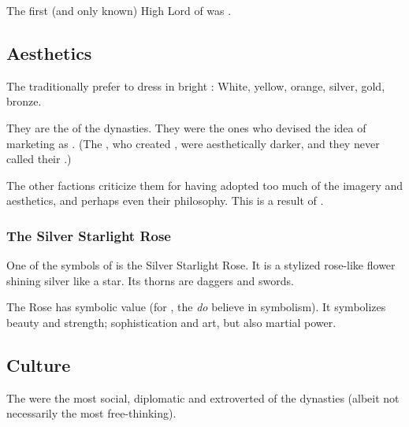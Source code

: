 The first (and only known) High Lord of \KiriathSepher{} was . 









\subsection{Aesthetics}
The \CiriathSepher{} traditionally prefer to dress in bright \colours: 
White, yellow, orange, silver, gold, bronze. 

They are the  of the dynasties. 
They were the ones who devised the idea of marketing \Iquin{} as . 
(The \Kezeradi{}, who created \Iquin, were aesthetically darker, and they never called their \dweomer{} .) 

The other factions criticize them for having adopted too much of the \Merkyran{} imagery and aesthetics, and perhaps even their philosophy. This is a result of .





\subsubsection{The Silver Starlight Rose}
One of the symbols of \CiriathSepher{} is the Silver Starlight Rose. 
It is a stylized rose-like flower shining silver like a star. 
Its thorns are daggers and swords. 

The Rose has symbolic value (for , the \CiriathSepher{} \emph{do} believe in symbolism). 
It symbolizes beauty and strength; sophistication and art, but also martial power. 









\subsection{Culture}
The \CiriathSepher{} were the most social, diplomatic and extroverted of the dynasties (albeit not necessarily the most free-thinking). 





